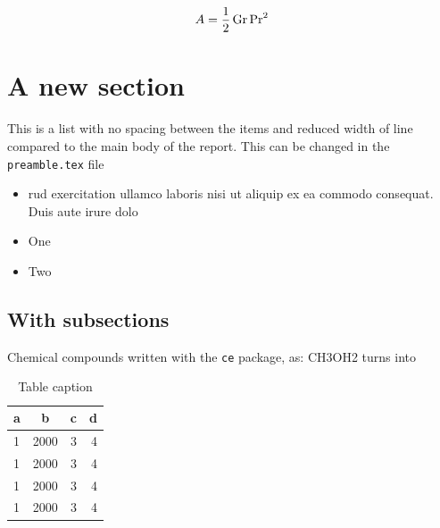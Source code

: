 $$
    A = \frac{1}{2} \mathrm{\,Gr} \mathrm{\,Pr}^2
$$





\section{A new section} \label{sec:a_new_section}


This is a list with no spacing between the items and reduced width of line compared to the main body of the report. This can be changed in the \texttt{preamble.tex} file
\begin{itemize}
\item rud exercitation ullamco laboris nisi ut aliquip ex ea commodo
consequat. Duis aute irure dolo
\item One
\item Two
\end{itemize}

\subsection{With subsections} \label{sub:with_subsections}

Chemical compounds written with the \texttt{ce} package, as: CH3OH2 turns into 

\begin{table}[H]    %
    \centering
    \caption{Table caption}
    \label{tab:sample_table} \vspace{-0.5em}
    \begin{tabular}{lccr}
        \hline
        a    & b        & c    & d      \\ \hline
        1    & 2000     & 3    &  4     \\
        1    & 2000     & 3    &  4     \\
        1    & 2000     & 3    &  4     \\
        1    & 2000     & 3    &  4     \\
        \hline
    \end{tabular}
\end{table}



